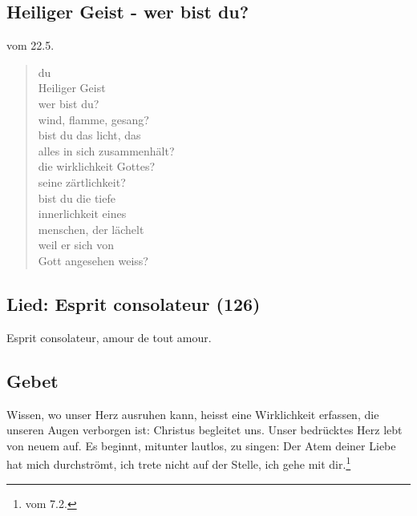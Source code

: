 \subsection{Heiliger Geist - wer bist du?}
\cite{KHH} vom 22.5.
\begin{gedicht}
\begin{verse}
du\\
Heiliger Geist\\
wer bist du?\\
wind, flamme, gesang?\\
bist du das licht, das\\
alles in sich zusammenhält?\\
die wirklichkeit Gottes?\\
seine zärtlichkeit?\\
bist du die tiefe\\
innerlichkeit eines\\
menschen, der lächelt\\
weil er sich von\\
Gott angesehen weiss?
\end{verse}
\end{gedicht}
\subsection{Lied: Esprit consolateur (126)}
Esprit consolateur, amour de tout amour.

\subsection{Gebet}
Wissen, wo unser Herz ausruhen kann, heisst eine Wirklichkeit erfassen, die unseren Augen verborgen ist: Christus begleitet uns. Unser bedrücktes Herz lebt von neuem auf. Es beginnt, mitunter lautlos, zu singen: Der Atem deiner Liebe hat mich durchströmt, ich trete nicht auf der Stelle, ich gehe mit dir.\footnote{\cite{FR-heute} vom 7.2.}


